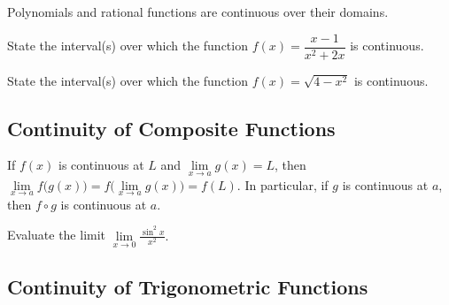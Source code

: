 \begin{corollary}

Polynomials and rational functions are continuous over their domains.

\end{corollary}


\begin{example}

State the interval(s) over which the function
\(f(x)=\dfrac{x-1}{x^2+2x}\) is continuous.

\end{example}
\vspace*{6\baselineskip}

\begin{example}

State the interval(s) over which the function \(f(x)=\sqrt{4-x^2}\) is
continuous.

\end{example}
\vspace*{6\baselineskip}

\hypertarget{continuity-of-composite-functions}{%
\subsection{Continuity of Composite
Functions}\label{continuity-of-composite-functions}}

\begin{theorem}

If \(f(x)\) is continuous at \(L\) and \(\lim\limits_{x\to a}g(x)=L\),
then
\(\lim\limits_{x\to a}f\big(g(x)\big)=f\big(\lim\limits_{x\to a}g(x)\big)=f(L).\)
In particular, if \(g\) is continuous at \(a\), then \(f\circ g\) is
continuous at \(a\).

\end{theorem}

\begin{example}

Evaluate the limit \(\lim\limits_{x\to 0}\frac{\sin^2x}{x^2}.\)

\end{example}
\vspace*{6\baselineskip}

\hypertarget{continuity-of-trigonometric-functions}{%
\subsection{Continuity of Trigonometric
Functions}\label{continuity-of-trigonometric-functions}}

